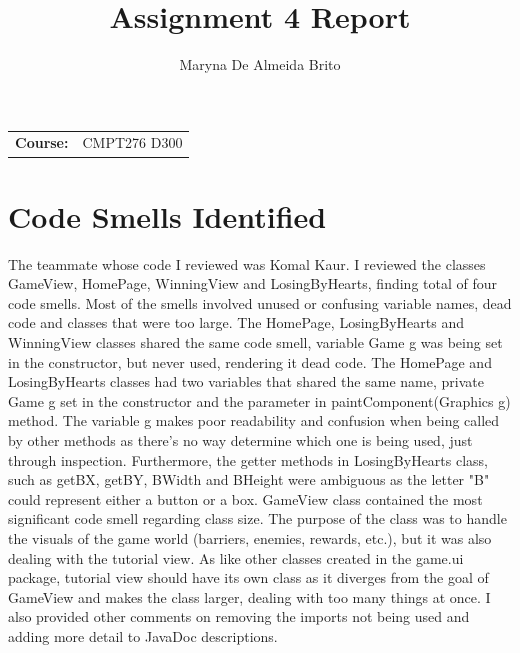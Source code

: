 \documentclass[12pt, letterpaper]{article}
\title{Assignment 4 Report}
\author{Maryna De Almeida Brito}
\begin{document}
\maketitle

\begin{tabular}{ll}

\textbf{Course:} & CMPT276 D300 \\

\end{tabular}


\section{Code Smells Identified}
The teammate whose code I reviewed was Komal Kaur. I reviewed the classes GameView, HomePage, WinningView and LosingByHearts, finding total of four code smells. Most of the smells involved unused or confusing variable names, dead code and classes that were too large. The HomePage, LosingByHearts and WinningView classes shared the same code smell, variable Game g was being set in the constructor, but never used, rendering it dead code. The HomePage and LosingByHearts classes had two variables that shared the same name, private Game g set in the constructor and the parameter in paintComponent(Graphics g) method. The variable g makes poor readability and confusion when being called by other methods as there's no way determine which one is being used, just through inspection. Furthermore, the getter methods in LosingByHearts class, such as getBX, getBY, BWidth and BHeight were ambiguous as the letter "B" could represent either a button or a box. GameView class contained the most significant code smell regarding class size. The purpose of the class was to handle the visuals of the game world (barriers, enemies, rewards, etc.), but it was also dealing with the tutorial view. As like other classes created in the game.ui package, tutorial view should have its own class as it diverges from the goal of GameView and makes the class larger, dealing with too many things at once. I also provided other comments on removing the imports not being used and adding more detail to JavaDoc descriptions.
\end{document}
